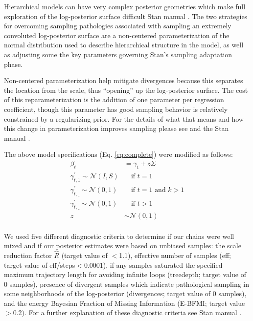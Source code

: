 \documentclass[12pt,letterpaper]{article}
\begin{document}
Hierarchical models can have very complex posterior geometries which make full exploration of the log-posterior surface difficult Stan manual \citep{StanManual}. The two strategies for overcoming sampling pathologies associated with sampling an extremely convoluted log-posterior surface are a non-centered parameterization of the normal distribution used to describe hierarchical structure in the model, as well as adjusting some the key parameters governing Stan's sampling adaptation phase.

Non-centered parameterization help mitigate divergences because this separates the location from the scale, thus ``opening'' up the log-posterior surface. The cost of this reparameterization is the addition of one parameter per regression coefficient, though this parameter has good sampling behavior is relatively constrained by a regularizing prior. For the details of what that means and how this change in parameterization improves sampling please see \citet{Betancourt2013} and the Stan manual \citep{StanManual}.

The above model specifications (Eq. \ref{eq:complete}) were modified as follows:
\begin{equation}
  \begin{aligned}
    \beta_{t} &= \gamma_{t} + z\Sigma \\
    \gamma^{'}_{t, 1} \sim \mathcal{N}(I, S) & \quad \text{if } t = 1 \\
    \gamma^{'}_{t, \_} \sim \mathcal{N}(0, 1) & \quad \text{if } t = 1 \text{ and } k > 1 \\
    \gamma^{'}_{t, \_} \sim \mathcal{N}(0, 1) & \quad \text{if } t > 1 \\
    z &\sim \mathcal{N}(0, 1) \\
  \end{aligned}
\end{equation}


We used five different diagnostic criteria to determine if our chains were well mixed and if our posterior estimates were based on unbiased samples: the scale reduction factor \(\hat{R}\) (target value of \(<\)1.1), effective number of samples (eff; target value of eff/steps\(<\)0.0001), if any samples saturated the specified maximum trajectory length for avoiding infinite loops (treedepth; target value of 0 samples), presence of divergent samples which indicate pathological sampling in some neighborhoods of the log-posterior (divergences; target value of 0 samples), and the energy Bayesian Fraction of Missing Information (E-BFMI; target value \(>\)0.2). For a further explanation of these diagnostic criteria see Stan manual \citep{StanManual}.
\end{document}
